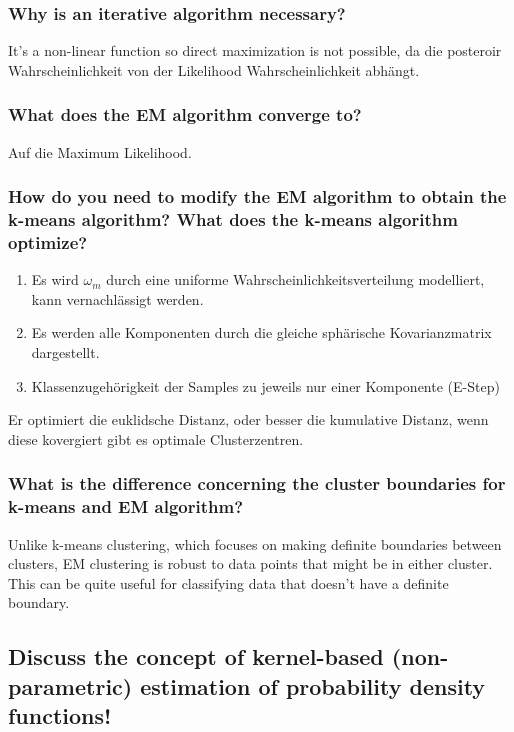 \documentclass[12pt]{scrartcl}
\begin{document}
\subsubsection{Why is an iterative algorithm necessary?}
It's a non-linear function so direct maximization is not possible, da die posteroir Wahrscheinlichkeit von der Likelihood Wahrscheinlichkeit abhängt.

\subsubsection{What does the EM algorithm converge to?}
Auf die Maximum Likelihood.

\subsubsection{How do you need to modify the EM algorithm to obtain the k-means algorithm? What does the k-means algorithm optimize?}

\begin{enumerate}
\item Es wird $\omega_m$ durch eine uniforme Wahrscheinlichkeitsverteilung modelliert, kann vernachlässigt werden.
\item Es werden alle Komponenten durch die gleiche sphärische Kovarianzmatrix dargestellt.
\item Klassenzugehörigkeit der Samples zu jeweils nur einer Komponente (E-Step)
\end{enumerate}
Er optimiert die euklidsche Distanz, oder besser die kumulative Distanz, wenn diese kovergiert gibt es optimale Clusterzentren.

\subsubsection{What is the difference concerning the cluster boundaries for k-means and EM algorithm?}

Unlike k-means clustering, which focuses on making definite boundaries between clusters, EM clustering is robust to data points that might be in either cluster. This can be quite useful for classifying data that doesn't have a definite boundary.

\subsection{Discuss the concept of kernel-based (non-parametric) estimation of probability density functions!}
\end{document}
